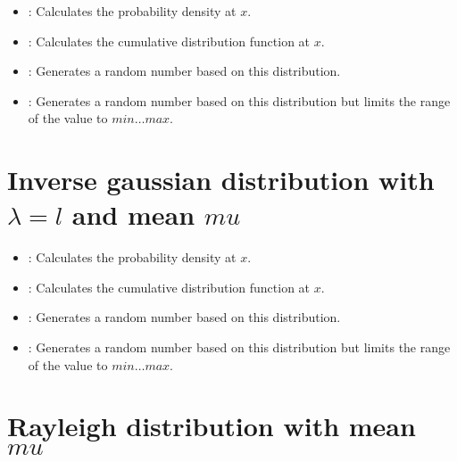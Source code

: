 \begin{itemize}

\item
{}:
Calculates the probability density at $x$.

\item
{}:
Calculates the cumulative distribution function at $x$.

\item
{}:
Generates a random number based on this distribution.

\item
{}:
Generates a random number based on this distribution but limits the range of the value to $min\ldots max$.

\end{itemize}


	
\section{Inverse gaussian distribution with \texorpdfstring{$\lambda=l$}{l} and mean \texorpdfstring{$mu$}{mu}}

\begin{itemize}

\item
{}:
Calculates the probability density at $x$.

\item
{}:
Calculates the cumulative distribution function at $x$.

\item
{}:
Generates a random number based on this distribution.

\item
{}:
Generates a random number based on this distribution but limits the range of the value to $min\ldots max$.

\end{itemize}



\section{Rayleigh distribution with mean \texorpdfstring{$mu$}{mu}}

